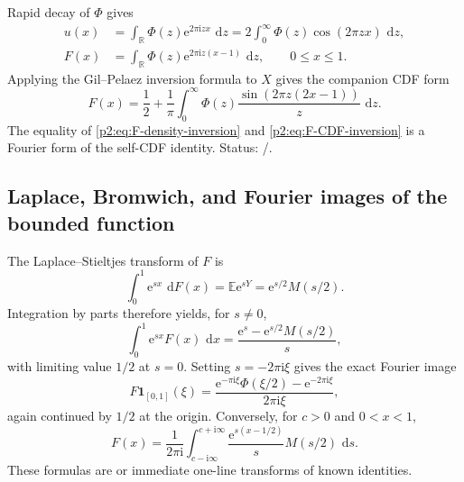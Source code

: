 \documentclass[11pt,oneside]{article}
\theoremstyle{definition}
\newcommand{\dd}{\,\mathrm d}
\newcommand{\e}{\mathrm e}
\newcommand{\ii}{\mathrm i}
\newcommand{\E}{\mathbb E}
\newcommand{\R}{\mathbb R}
\begin{document}
Rapid decay of $\Phi$ gives
\begin{align}
 u(x)&=\int_{\R}\Phi(z)\e^{2\pi\ii zx}\,\dd z
      =2\int_0^{\infty}\Phi(z)\cos(2\pi zx)\,\dd z,        \label{p2:eq:u-Fourier-inversion}\\
 F(x)&=\int_{\R}\Phi(z)\e^{2\pi\ii z(x-1)}\,\dd z,
      \qquad 0\le x\le1.                                  \label{p2:eq:F-density-inversion}
\end{align}
Applying the Gil--Pelaez inversion formula to $X$ gives the companion CDF form
\begin{equation}
 F(x)=\frac12+\frac1\pi\int_0^{\infty}
       \Phi(z)\frac{\sin(2\pi z(2x-1))}{z}\,\dd z.         \label{p2:eq:F-CDF-inversion}
\end{equation}
The equality of \eqref{p2:eq:F-density-inversion} and
\eqref{p2:eq:F-CDF-inversion} is a Fourier form of the self-CDF identity.
Status: \statusknown/\statusderived.

\subsection{Laplace, Bromwich, and Fourier images of the bounded function}

The Laplace--Stieltjes transform of $F$ is
\begin{equation}
 \int_0^1\e^{sx}\,\dd F(x)=\E\e^{sY}
 =\e^{s/2}M(s/2).                                          \label{p2:eq:F-LS}
\end{equation}
Integration by parts therefore yields, for $s\ne0$,
\begin{equation}
 \int_0^1\e^{sx}F(x)\,\dd x
 =\frac{\e^s-\e^{s/2}M(s/2)}{s},                           \label{p2:eq:F-Laplace}
\end{equation}
with limiting value $1/2$ at $s=0$.  Setting $s=-2\pi\ii\xi$ gives the exact
Fourier image
\begin{equation}
 \widehat{F\mathbf1_{[0,1]}}(\xi)
 =\frac{\e^{-\pi\ii\xi}\Phi(\xi/2)-\e^{-2\pi\ii\xi}}
        {2\pi\ii\xi},                                    \label{p2:eq:F-Fourier}
\end{equation}
again continued by $1/2$ at the origin.  Conversely, for $c>0$ and
$0<x<1$,
\begin{equation}
 F(x)=\frac1{2\pi\ii}\int_{c-\ii\infty}^{c+\ii\infty}
       \frac{\e^{s(x-1/2)}}{s}M(s/2)\,\dd s.               \label{p2:eq:F-Bromwich}
\end{equation}
These formulas are \statusknown or immediate one-line transforms of known
identities.
\end{document}

